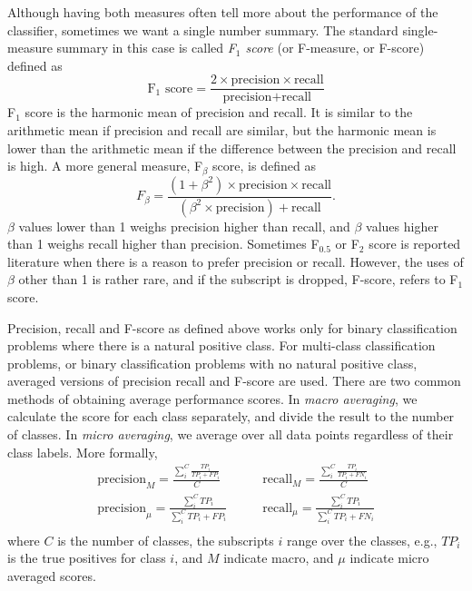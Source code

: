 Although having both measures often tell more
about the performance of the classifier,
sometimes we want a single number summary.
The standard single-measure summary in this case is called
\emph{F$_\text{1}$ score} (or F-measure, or F-score) defined as
\begin{equation*}
  \text{F$_\text{1}$ score} = \frac{2\times \text{precision} \times \text{recall}}{\text{precision} + \text{recall}}
\end{equation*}
F$_\text{1}$ score is the harmonic mean of precision and recall.
It is similar to the arithmetic mean if precision and recall are similar,
but the harmonic mean is lower than the arithmetic mean
if the difference between the precision and recall is high.
A more general measure, F$_\beta$ score, is defined as
\begin{equation*}
  F_\beta =  \frac{(1 + \beta^2)\times\text{precision} \times \text{recall}}{(\beta^{2} \times \text{precision}) + \text{recall}} .
\end{equation*}
$\beta$ values lower than \num{1} weighs precision higher than recall,
and $\beta$ values higher than \num{1} weighs recall higher than precision.
Sometimes F$_\text{0.5}$ or  F$_\text{2}$ score is reported literature
when there is a reason to prefer precision or recall.
However, the uses of $\beta$ other than \num{1} is rather rare,
and if the subscript is dropped, F-score, refers to F$_\text{1}$ score.

Precision, recall and F-score as defined above works only
for binary classification problems
where there is a natural positive class.%
For multi-class classification problems,
or binary classification problems with no natural positive class,
averaged versions of precision recall and F-score are used.
There are two common methods of obtaining average performance scores.
In \emph{macro averaging},
we calculate the score for each class separately,
and divide the result to the number of classes.
In \emph{micro averaging},
we average over all data points regardless of their class labels.
More formally, 
\begin{align*}
  \text{precision}_{M} = 
    \frac{\sum_{i}^{C} \frac{TP_{i}}{TP_{i}+FP_{i}}}{C}
  &\quad\quad
  \text{recall}_{M} = 
    \frac{\sum_{i}^{C} \frac{TP_{i}}{TP_{i}+FN_{i}}}{C}\\[2mm]
  \text{precision}_{\mu} = 
    \frac{\sum_{i}^{C} TP_{i}}%
         {\sum_{i}^{C} TP_{i}+FP_{i}}
  &\quad\quad
  \text{recall}_{\mu} = 
    \frac{\sum_{i}^{C} TP_{i}}%
         {\sum_{i}^{C} TP_{i}+FN_{i}}\\
\end{align*}
where $C$ is the number of classes, the subscripts $i$ range over the classes,
e.g., $TP_{i}$ is the true positives for class $i$,
and $M$ indicate macro, and $\mu$ indicate micro averaged scores.

